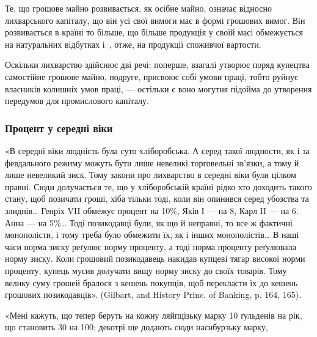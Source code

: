 Те, що грошове майно розвивається, як осібне майно, означає відносно
лихварського капіталу, що він усі свої вимоги має в формі грошових вимог.
Він розвивається в країні то більше, що більше продукція у своїй масі обмежується
на натуральних відбутках і~, отже, на продукції споживчої вартости.

Оскільки лихварство здійснює дві речі: поперше, взагалі утворює поряд
купецтва самостійне грошове майно, подруге, присвоює собі умови праці, тобто
руйнує власників колишніх умов праці, — остільки є воно могутня підойма до
утворення передумов для промислового капіталу.

\subsubsection{Процент у середні віки}

«В середні віки людність була суто хліборобська. А серед такої людности,
як і за февдального режиму можуть бути лише невеликі торговельні зв’язки, а
тому й лише невеликий зиск. Тому закони про лихварство в середні віки були
цілком правні. Сюди долучається те, що у хліборобській країні рідко хто доходить
такого стану, щоб позичати гроші, хіба тільки тоді, коли він опинився
серед убозства та злиднів\dots{} Генріх VII обмежує процент на 10\%, Яків І —
на 8, Карл II — на 6. Анна — на 5\%\dots{} Тоді позикодавці були, як що й неправні,
то все ж фактичні монополісти, і тому треба було обмежити їх, як і інших монополістів\dots{}
В наші часи норма зиску реґулює норму проценту, а тоді норма проценту
реґулювала норму зиску. Коли грошовий позикодавець накидав купцеві тягар високої
норми проценту, купець мусив долучати вищу норму зиску до своїх товарів.
Тому велику суму грошей бралося з кешень покупців, щоб перекласти їх до кешень
грошових позикодавців». (Gilbart, and History Princ. of Banking, p. 164, 165).

«Мені кажуть, що тепер беруть на кожну ляйпцізьку марку 10 ґульденів
на рік, що становить 30 на 100; декотрі ще додають сюди наєнбурзьку марку,
\parbreak{}  %
